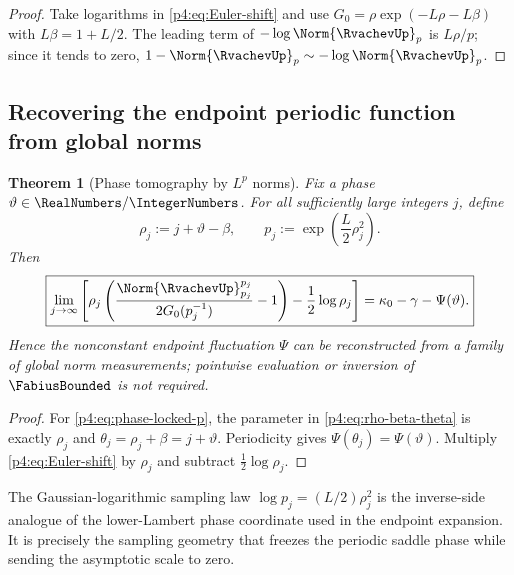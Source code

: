 \documentclass[11pt,oneside]{article}
\newtheorem{theorem}{Theorem}[section]
\theoremstyle{definition}
\theoremstyle{remark}
\begin{document}
\begin{proof}
Take logarithms in \eqref{p4:eq:Euler-shift} and use
$G_0=\rho\exp(-L\rho-L\beta)$ with $L\beta=1+L/2$.  The leading term of
$-\log\Norm{\RvachevUp}_p$ is $L\rho/p$; since it tends to zero,
$1-\Norm{\RvachevUp}_p\sim-\log\Norm{\RvachevUp}_p$.
\end{proof}

\subsection{Recovering the endpoint periodic function from global norms}

\begin{theorem}[Phase tomography by $L^p$ norms]
\label{p4:thm:phase-tomography}
Fix a phase $\vartheta\in\RealNumbers/\IntegerNumbers$.  For all sufficiently large integers $j$, define
\begin{equation}
 \rho_j:=j+\vartheta-\beta,
 \qquad
 p_j:=\exp\!\left(\frac L2\rho_j^2\right).
 \label{p4:eq:phase-locked-p}
\end{equation}
Then
\begin{equation}
 \boxed{
 \lim_{j\to\infty}
 \left[
 \rho_j\left(
 \frac{\Norm{\RvachevUp}_{p_j}^{p_j}}{2G_0(p_j^{-1})}-1
 \right)-\frac12\log\rho_j
 \right]
 =\kappa_0-\gamma-\Psi(\vartheta).}
 \label{p4:eq:phase-tomography-limit}
\end{equation}
Hence the nonconstant endpoint fluctuation $\Psi$ can be reconstructed from a family of
\emph{global norm measurements}; pointwise evaluation or inversion of
$\FabiusBounded$ is not required.
\end{theorem}

\begin{proof}
For \eqref{p4:eq:phase-locked-p}, the parameter in \eqref{p4:eq:rho-beta-theta} is exactly
$\rho_j$ and $\theta_j=\rho_j+\beta=j+\vartheta$.  Periodicity gives
$\Psi(\theta_j)=\Psi(\vartheta)$.  Multiply \eqref{p4:eq:Euler-shift} by $\rho_j$ and subtract
$\frac12\log\rho_j$.
\end{proof}

\begin{remark}
The Gaussian-logarithmic sampling law $\log p_j=(L/2)\rho_j^2$ is the inverse-side analogue
of the lower-Lambert phase coordinate used in the endpoint expansion.  It is precisely the
sampling geometry that freezes the periodic saddle phase while sending the asymptotic scale
to zero.
\end{remark}
\end{document}
